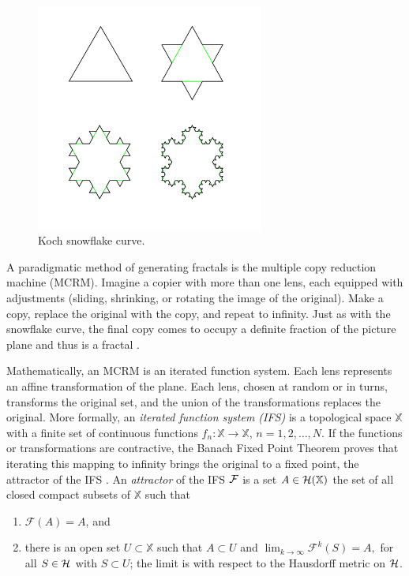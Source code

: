 \documentclass[english,11pt,letterpaper,onecolumn]{scrartcl}
\numberwithin{equation}{section}
\newcommand{\X}{\mathbb{X}}
\newcommand{\cF}{\mathcal{F}}
\begin{document}
\begin{figure}
\centerline{\includegraphics[width = 0.6667\textwidth]{KochFlake}}
\caption{\label{fig:kochflake} Koch snowflake
curve.\protect\footnotemark}
\end{figure}


A paradigmatic method of generating fractals is the multiple copy reduction
machine (MCRM). Imagine a copier with more than one lens, each equipped with
adjustments (sliding, shrinking, or rotating the image of the original). Make a
copy, replace the original with the copy, and repeat to infinity. Just as with
the snowflake curve, the final copy comes to occupy a definite fraction of the
picture plane and thus is a fractal \cite{chaosandfractals}.

Mathematically, an MCRM is an iterated function system. Each lens represents an
affine transformation of the plane. Each lens, chosen at random or in turns,
transforms the original set, and the union of the transformations replaces the
original. More formally, an \emph{iterated function system (IFS)} is a
topological space $\mathbb{X}$ with a finite set of continuous functions
$f_{n}:\X\rightarrow \X$, $n=1,2,\dots,N$. If the functions or transformations
are contractive, the Banach Fixed Point Theorem proves that iterating this
mapping to infinity brings the original to a fixed point, the attractor of the
IFS \cite{chaosandfractals, barnsley1985iterated, 10.2307/24893080,
fractalseverywhere}. An \emph{attractor} of the IFS $\cal{F}$ is a set $A\in
\cal{H}(\X)$ the set of all closed compact subsets of $\X$ such that
\begin{enumerate}
\item $\cF(A)=A$, and
\item there is an open set $U\subset \X$ such that $A\subset U$ and
$\lim_{k\rightarrow\infty}\mathcal{F}^{k}(S)=A,$ for all $S\in \cal{H}$ with
$S\subset U$; the limit is with respect to the Hausdorff metric on $\cal{H}$.
\end{enumerate}
\end{document}
